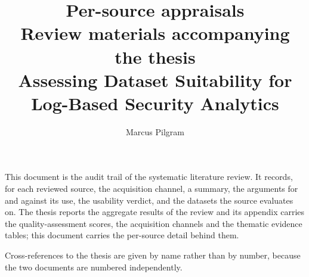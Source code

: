 \documentclass[11pt,a4paper]{article}
\title{Per-source appraisals\\[0.3em]
  \large Review materials accompanying the thesis\\
  \normalsize Assessing Dataset Suitability for Log-Based Security Analytics}
\author{Marcus Pilgram}
\date{}
\begin{document}
\maketitle

\noindent
This document is the audit trail of the systematic literature review. It
records, for each reviewed source, the acquisition channel, a summary, the
arguments for and against its use, the usability verdict, and the datasets the
source evaluates on. The thesis reports the aggregate results of the review and
its appendix carries the quality-assessment scores, the acquisition channels and
the thematic evidence tables; this document carries the per-source detail behind
them.

\medskip\noindent
Cross-references to the thesis are given by name rather than by number, because
the two documents are numbered independently.

\tableofcontents
\bigskip





\end{document}
